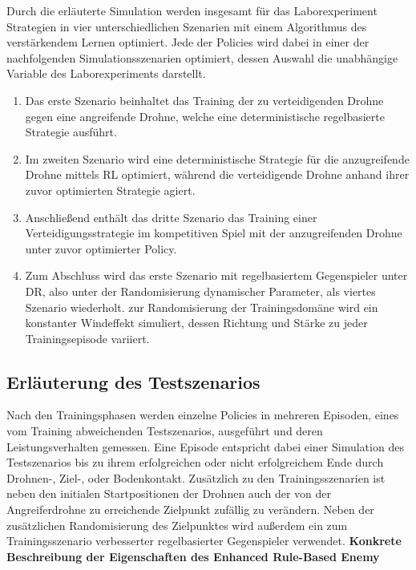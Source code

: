 Durch die erläuterte Simulation werden insgesamt für das Laborexperiment Strategien in vier unterschiedlichen Szenarien mit einem Algorithmus des verstärkendem Lernen optimiert.
Jede der Policies wird dabei in einer der nachfolgenden Simulationsszenarien optimiert, dessen Auswahl die unabhängige Variable des Laborexperiments darstellt.
\begin{enumerate}
    \item Das erste Szenario beinhaltet das Training der zu verteidigenden Drohne gegen eine angreifende Drohne, welche eine deterministische regelbasierte Strategie ausführt.
    \item Im zweiten Szenario wird eine deterministische Strategie für die anzugreifende Drohne mittels RL optimiert, während die verteidigende Drohne anhand ihrer zuvor optimierten Strategie agiert.
    \item Anschließend enthält das dritte Szenario das Training einer Verteidigungsstrategie im kompetitiven Spiel mit der anzugreifenden Drohne unter zuvor optimierter Policy.
    \item Zum Abschluss wird das erste Szenario mit regelbasiertem Gegenspieler unter DR, also unter der Randomisierung dynamischer Parameter, als viertes Szenario wiederholt. 
    zur Randomisierung der Trainingsdomäne wird ein konstanter Windeffekt simuliert, dessen Richtung und Stärke zu jeder Trainingsepisode variiert. 
\end{enumerate}

\subsection{Erläuterung des Testszenarios}

Nach den Trainingsphasen werden einzelne Policies in mehreren Episoden, eines vom Training abweichenden Testszenarios, ausgeführt und deren Leistungsverhalten gemessen.
Eine Episode entspricht dabei einer Simulation des Testszenarios bis zu ihrem erfolgreichen oder nicht erfolgreichem Ende durch Drohnen-, Ziel-, oder Bodenkontakt.
Zusätzlich zu den Trainingsszenarien ist neben den initialen Startpositionen der Drohnen auch der von der Angreiferdrohne zu erreichende Zielpunkt zufällig zu verändern.
Neben der zusätzlichen Randomisierung des Zielpunktes wird außerdem ein zum Trainingsszenario verbesserter regelbasierter Gegenspieler verwendet.
\textbf{Konkrete Beschreibung der Eigenschaften des Enhanced Rule-Based Enemy}

